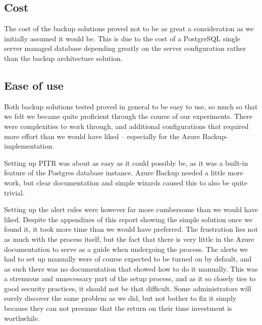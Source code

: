 
\subsection{Cost}
The cost of the backup solutions proved not to be as great a consideration as we initially assumed it would be. This is due to the cost of a PostgreSQL single server managed database depending greatly on the server configuration rather than the backup architecture solution. 


\subsection{Ease of use}
Both backup solutions tested proved in general to be easy to use, so much so that we felt we became quite proficient through the course of our experiments. There were complexities to work through, and additional configurations that required more effort than we would have liked -- especially for the Azure Backup-implementation. 

Setting up PITR was about as easy as it could possibly be, as it was a built-in feature of the Postgres database instance. Azure Backup needed a little more work, but clear documentation and simple wizards caused this to also be quite trivial. 

Setting up the alert rules were however far more cumbersome than we would have liked. Despite the appendixes of this report showing the simple solution once we found it, it took more time than we would have preferred. The frustration lies not as much with the process itself, but the fact that there is very little in the Azure documentation to serve as a guide when undergoing the process. The alerts we had to set up manually were of course expected to be turned on by default, and as such there was no documentation that showed how to do it manually. This was a strenuous and unnecessary part of the setup process, and as it so closely ties to good security practices, it should not be that difficult. Some administrators will surely discover the same problem as we did, but not bother to fix it simply because they can not presume that the return on their time investment is worthwhile.

